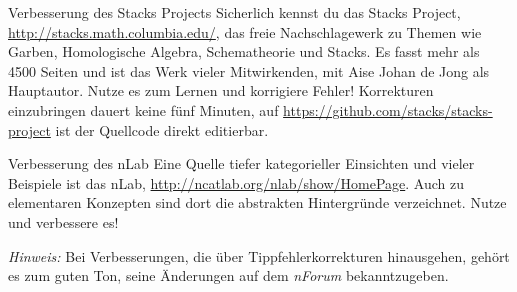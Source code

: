 \documentclass{uebblatt}
\begin{document}

\vspace{-0.5cm}
\begin{center}
  \setlength{\fboxsep}{0pt}
\end{center}
\vspace{0.3cm}

\begin{aufgabe}{Verbesserung des Stacks Projects}
Sicherlich kennst du das Stacks Project,
\url{http://stacks.math.columbia.edu/}, das freie Nachschlagewerk zu Themen wie
Garben, Homologische Algebra, Schematheorie und Stacks. Es fasst mehr als 4500
Seiten und ist das Werk vieler Mitwirkenden, mit Aise Johan de
Jong als Hauptautor. Nutze es zum Lernen und korrigiere Fehler! Korrekturen
einzubringen dauert keine fünf Minuten, auf
\url{https://github.com/stacks/stacks-project} ist der Quellcode direkt
editierbar.
\end{aufgabe}

\begin{aufgabe}{Verbesserung des nLab}
Eine Quelle tiefer kategorieller Einsichten und vieler Beispiele ist das nLab,
\url{http://ncatlab.org/nlab/show/HomePage}. Auch zu elementaren Konzepten sind
dort die abstrakten Hintergründe verzeichnet. Nutze und verbessere es!

{\tiny\emph{Hinweis:} Bei Verbesserungen, die über Tippfehlerkorrekturen
hinausgehen, gehört es zum guten Ton, seine Änderungen auf dem \emph{nForum}
bekanntzugeben.\par}
\end{aufgabe}
\end{document}
